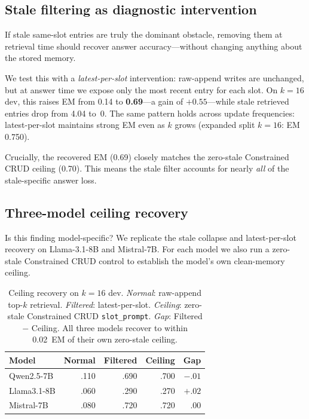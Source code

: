 \documentclass[11pt,twocolumn]{article}
\begin{document}
\subsection{Stale filtering as diagnostic intervention}

If stale same-slot entries are truly the dominant obstacle, removing them at retrieval time should recover answer accuracy---without changing anything about the stored memory.

We test this with a \emph{latest-per-slot} intervention: raw-append writes are unchanged, but at answer time we expose only the most recent entry for each slot.
On \(k{=}16\) dev, this raises EM from 0.14 to \textbf{0.69}---a gain of \(+0.55\)---while stale retrieved entries drop from 4.04 to~0.
The same pattern holds across update frequencies: latest-per-slot maintains strong EM even as \(k\) grows (expanded split \(k{=}16\): EM 0.750).

Crucially, the recovered EM (0.69) closely matches the zero-stale Constrained CRUD ceiling (0.70).
This means the stale filter accounts for nearly \emph{all} of the stale-specific answer loss.

\subsection{Three-model ceiling recovery}

Is this finding model-specific?
We replicate the stale collapse and latest-per-slot recovery on Llama-3.1-8B and Mistral-7B.
For each model we also run a zero-stale Constrained CRUD control to establish the model's own clean-memory ceiling.

\begin{table}[t]
\centering
\small
\begin{tabular}{lrrrr}
\toprule
Model & Normal & Filtered & Ceiling & Gap \\
\midrule
Qwen2.5-7B   & .110 & .690 & .700 & $-.01$ \\
Llama3.1-8B  & .060 & .290 & .270 & $+.02$ \\
Mistral-7B   & .080 & .720 & .720 & $.00$ \\
\bottomrule
\end{tabular}
\caption{Ceiling recovery on \(k{=}16\) dev. \emph{Normal}: raw-append top-\(k\) retrieval. \emph{Filtered}: latest-per-slot. \emph{Ceiling}: zero-stale Constrained CRUD \texttt{slot\_prompt}. \emph{Gap}: Filtered $-$ Ceiling. All three models recover to within 0.02~EM of their own zero-stale ceiling.}
\label{tab:ceiling-recovery}
\end{table}
\end{document}
